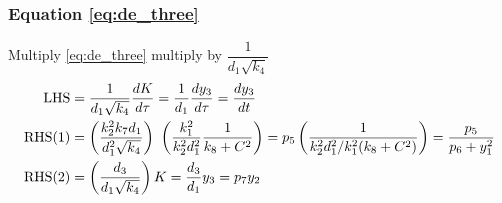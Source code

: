 \documentclass[10pt,letterpaper]{article}
\begin{document}
\subsubsection{Equation \eqref{eq:de_three}}
Multiply \eqref{eq:de_three} multiply by $\dfrac{1}{d_1 \sqrt{k_4}}$
\begin{equation} \label{eq:nondim_de_three}
\begin{gathered}\begin{aligned}
{\rm LHS} &= \frac{1}{d_1 \sqrt{k_4}} \frac{dK}{d\tau} 
           = \frac{1}{d_1} \frac{dy_3}{d\tau} 
           = \frac{dy_3}{dt} \\
{\rm RHS(1)} &= \left( \frac{k_2^2 k_7 d_1}{d_1^2 \sqrt{k_4}} \right) \
              \left(  \frac{k_1^2}{k_2^2 d_1^2} \frac{1}{k_8 + C^2} \right)
              = p_5 \left( \frac{1}{ k_2^2 d_1^2 / k_1^2 (k_8+C^2)}\right)
              = \frac{p_5}{ p_6 + y_1^2}  \\
{\rm RHS(2)} &= \left( \frac{d_3}{d_1 \sqrt{k_4}} \right) K = \frac{d_3}{d_1} y_3 = p_7 y_2
\end{aligned}\end{gathered}
\end{equation}
\end{document}

